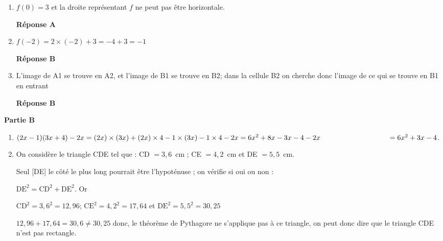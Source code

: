 \begin{enumerate}
\item $f(0)=3$ et la droite représentant $f$ ne peut pas être horizontale.

\hfill\textbf{Réponse A}
\item $f(-2)=2\times(-2)+3=-4+3=-1$

\hfill\textbf{Réponse B}
\item L'image de A1 se trouve en A2, et l'image de B1 se trouve en B2; dans la cellule B2 on cherche donc l'image de ce qui se trouve en B1 en entrant 

\hfill\textbf{Réponse B}
\end{enumerate}
\medskip

\textbf{Partie B}

\medskip

\begin{enumerate}
\item $(2x - 1)(3x + 4) - 2x 
=(2x)\times(3x)+(2x)\times 4 - 1\times (3x) -1 \times 4 - 2x
= 6x^2 +8x -3x -4 - 2x\\
\phantom{(2x - 1)(3x + 4) - 2x }
= 6x^2 + 3x - 4$.

\item On considère le triangle CDE tel que : CD $= 3,6$~cm ; CE $= 4,2$~cm et DE $= 5,5$~cm.

Seul [DE] le côté le plus long pourrait être l'hypoténuse ; on vérifie si oui ou non :

$\text{DE}^2 = \text{CD}^2 + \text{DE}^2$. Or 

$\text{CD}^2=3,6^2=12,96$; $\text{CE}^2=4,2^2=17,64$ et $\text{DE}^2=5,5^2=30,25$

$12,96 + 17,64 = 30,6 \neq 30,25$ donc, le théorème de Pythagore ne s'applique pas  à ce triangle, on peut donc dire que le triangle CDE n'est pas rectangle.
\end{enumerate}

\bigskip

